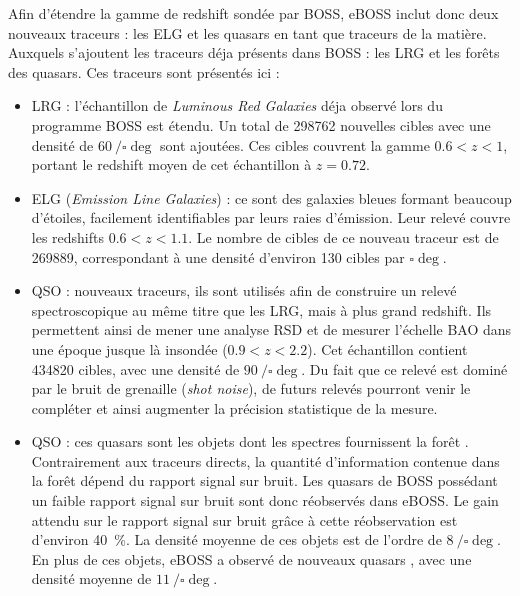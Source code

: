 Afin d'étendre la gamme de redshift sondée par BOSS, eBOSS inclut donc deux nouveaux traceurs : les ELG et les quasars en tant que traceurs de la matière. Auxquels s'ajoutent les traceurs déja présents dans BOSS : les LRG et les forêts \lya{} des quasars. Ces traceurs sont présentés ici :
\begin{itemize}
  \item LRG : l'échantillon de \emph{Luminous Red Galaxies} déja observé lors du programme BOSS est étendu. Un total de \num{298762} nouvelles cibles avec une densité de $\SI{60}{\per\square\deg}$ sont ajoutées. Ces cibles couvrent la gamme $\num{0,6} < z < \num{1}$, portant le redshift moyen de cet échantillon à $z = \num{0.72}$.
  \item ELG (\emph{Emission Line Galaxies}) : ce sont des galaxies bleues formant beaucoup d'étoiles, facilement identifiables par leurs raies d'émission. Leur relevé couvre les redshifts $\num{0,6} < z < \num{1,1}$. Le nombre de cibles de ce nouveau traceur est de \num{269889}, correspondant à une densité d'environ \num{130} cibles par $\si{\square\deg}$.
  \item QSO : nouveaux traceurs, ils sont utilisés afin de construire un relevé spectroscopique au même titre que les LRG, mais à plus grand redshift. Ils permettent ainsi de mener une analyse RSD et de mesurer l'échelle BAO dans une époque jusque là insondée ($\num{0,9} < z < \num{2,2}$).
    Cet échantillon contient \num{434820} cibles, avec une densité de $\SI{90}{\per\square\deg}$. Du fait que ce relevé est dominé par le bruit de grenaille (\emph{shot noise}), de futurs relevés pourront venir le compléter et ainsi augmenter la précision statistique de la mesure.
  \item \lya{} QSO : ces quasars sont les objets dont les spectres fournissent la forêt \lya{}. Contrairement aux traceurs directs, la quantité d'information contenue dans la forêt \lya{} dépend du rapport signal sur bruit. Les quasars \lya{} de BOSS possédant un faible rapport signal sur bruit sont donc réobservés dans eBOSS. Le gain attendu sur le rapport signal sur bruit grâce à cette réobservation est d'environ \SI{40}{\percent}. La densité moyenne de ces objets est de l'ordre de $\SI{8}{\per\square\deg}$.
  En plus de ces objets, eBOSS a observé de nouveaux quasars \lya{}, avec une densité moyenne de $\SI{11}{\per\square\deg}$.
\end{itemize}
